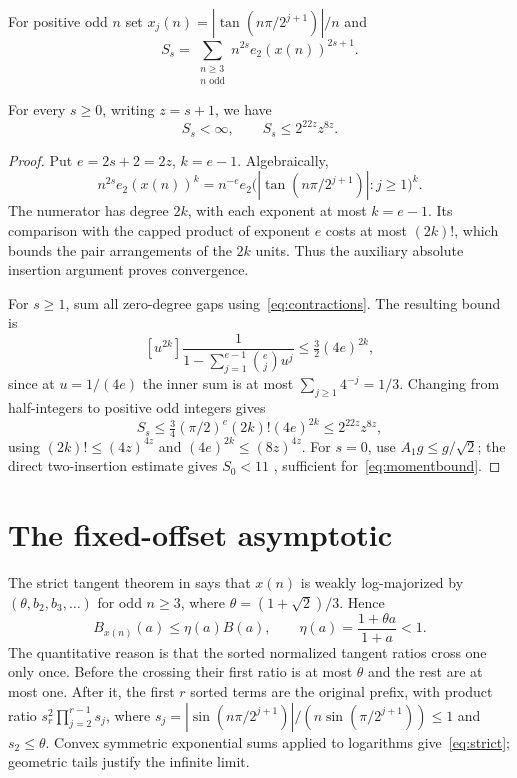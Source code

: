 \documentclass[11pt,a4paper]{article}
\theoremstyle{remark}\newtheorem*{ednote}{Editorial note (ProveIt, 2026-10-01)}
\begin{document}
For positive odd $n$ set $x_j(n)=|\tan(n\pi/2^{j+1})|/n$ and
\[
S_s=\sum_{\substack{n\ge3\\n\text{ odd}}}n^{2s}e_2(x(n))^{2s+1}.
\]
\begin{lemma}\label{lem:moment}
For every $s\ge0$, writing $z=s+1$, we have
\begin{equation}\label{eq:momentbound}
S_s<\infty,\qquad S_s\le2^{22z}z^{8z}.
\end{equation}
\end{lemma}
\begin{proof}
Put $e=2s+2=2z$, $k=e-1$. Algebraically,
\[
n^{2s}e_2(x(n))^k=n^{-e}e_2\bigl(|\tan(n\pi/2^{j+1})|:j\ge1\bigr)^k.
\]
The numerator has degree $2k$, with each exponent at most $k=e-1$. Its comparison with the capped product of exponent $e$ costs at most $(2k)!$, which bounds the pair arrangements of the $2k$ units. Thus the auxiliary absolute insertion argument proves convergence.

For $s\ge1$, sum all zero-degree gaps using~\eqref{eq:contractions}. The resulting bound is
\[
[u^{2k}]\frac1{1-\sum_{j=1}^{e-1}\binom ej u^j}
\le\tfrac32(4e)^{2k},
\]
since at $u=1/(4e)$ the inner sum is at most $\sum_{j\ge1}4^{-j}=1/3$. Changing from half-integers to positive odd integers gives
\[
S_s\le\tfrac34(\pi/2)^e(2k)!(4e)^{2k}\le2^{22z}z^{8z},
\]
using $(2k)!\le(4z)^{4z}$ and $(4e)^{2k}\le(8z)^{4z}$. For $s=0$, use $A_1g\le g/\sqrt2$; the direct two-insertion estimate gives $S_0<11$ \cite{boundary}, sufficient for~\eqref{eq:momentbound}.
\end{proof}

\section{The fixed-offset asymptotic}
The strict tangent theorem in \cite{boundary} says that $x(n)$ is weakly log-majorized by $(\theta,b_2,b_3,\ldots)$ for odd $n\ge3$, where $\theta=(1+\sqrt2)/3$. Hence
\begin{equation}\label{eq:strict}
B_{x(n)}(a)\le\eta(a)B(a),\qquad \eta(a)=\frac{1+\theta a}{1+a}<1.
\end{equation}
The quantitative reason is that the sorted normalized tangent ratios cross one only once. Before the crossing their first ratio is at most $\theta$ and the rest are at most one. After it, the first $r$ sorted terms are the original prefix, with product ratio $s_r^2\prod_{j=2}^{r-1}s_j$, where $s_j=|\sin(n\pi/2^{j+1})|/(n\sin(\pi/2^{j+1}))\le1$ and $s_2\le\theta$. Convex symmetric exponential sums applied to logarithms give~\eqref{eq:strict}; geometric tails justify the infinite limit.
\end{document}
